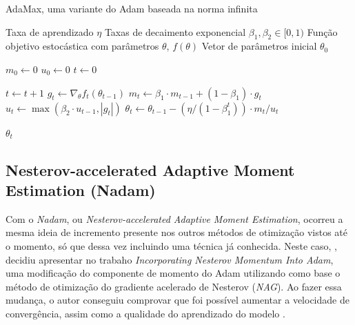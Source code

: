 \begin{algorithm}[H] %
    \caption{AdaMax, uma variante do Adam baseada na norma infinita}
    \label{alg:adamax}
    \begin{algorithmic}[1] %

    \Require Taxa de aprendizado $\eta$
    \Require Taxas de decaimento exponencial $\beta_1, \beta_2 \in [0, 1)$
    \Require Função objetivo estocástica com parâmetros $\theta$, $f(\theta)$
    \Require Vetor de parâmetros inicial $\theta_0$

    \State $m_0 \leftarrow 0$ 
    \State $u_0 \leftarrow 0$ 
    \State $t \leftarrow 0$ 

        \State $t \leftarrow t + 1$
        \State $g_t \leftarrow \nabla_\theta f_t(\theta_{t-1})$ 
        \State $m_t \leftarrow \beta_1 \cdot m_{t-1} + (1 - \beta_1) \cdot g_t$ 
        \State $u_t \leftarrow \max(\beta_2 \cdot u_{t-1}, |g_t|)$ 
        \State $\theta_t \leftarrow \theta_{t-1} - (\eta / (1 - \beta_1^t)) \cdot m_t / u_t$ 
    \EndWhile

    \State \Return $\theta_t$ 
    \end{algorithmic}
\end{algorithm}

\subsection{Nesterov-accelerated Adaptive Moment Estimation (Nadam)} 

Com o \textit{Nadam}, ou \textit{Nesterov-accelerated Adaptive Moment Estimation}, ocorreu a mesma ideia de incremento presente nos outros métodos de otimização vistos até o momento, só que dessa vez incluindo uma técnica já conhecida. Neste caso, \textcite{NadamMethod}, decidiu apresentar no trabaho \textit{Incorporating Nesterov Momentum Into Adam}, uma modificação do componente de momento do Adam utilizando como base o método de otimização do gradiente acelerado de Nesterov (\textit{NAG}). Ao fazer essa mudança, o autor conseguiu comprovar que foi possível aumentar a velocidade de convergência, assim como a qualidade do aprendizado do modelo \parencite{NadamMethod}.


